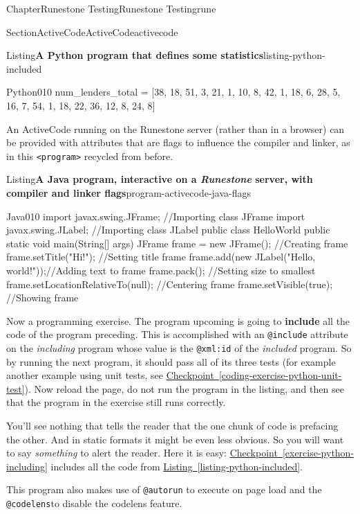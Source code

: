 \documentclass[oneside,10pt,]{book}
\newcommand{\xreffont}{\relax}
\newcommand{\mono}[1]{\texttt{#1}}
\newcommand{\terminology}[1]{\textbf{#1}}
\newcommand{\pubtitle}[1]{\textsl{#1}}
\numberwithin{equation}{section}
\begin{document}
\begin{chapterptx}{Chapter}{Runestone Testing}{}{Runestone Testing}{}{}{rune}
\begin{sectionptx}{Section}{ActiveCode}{}{ActiveCode}{}{}{activecode}
\begin{listingptx}{Listing}{\textbf{A Python program that defines some statistics}}{listing-python-included}{}
\begin{program}{Python}{0}{1}{0}
num_lenders_total = [38, 18, 51, 3, 21, 1, 10, 8, 42, 1, 18, 6, 28, 5, 16, 7, 54, 1, 18, 22, 36, 12, 8, 24, 8]
\end{program}
\end{listingptx}%
An ActiveCode running on the Runestone server (rather than in a browser) can be provided with attributes that are flags to influence the compiler and linker, as in this \mono{<program>} recycled from before.%
\begin{listingptx}{Listing}{\textbf{A Java program, interactive on a \pubtitle{Runestone} server, with compiler and linker flags}}{program-activecode-java-flags}{}%
\begin{program}{Java}{0}{1}{0}
import javax.swing.JFrame;  //Importing class JFrame
import javax.swing.JLabel;  //Importing class JLabel
public class HelloWorld {
    public static void main(String[] args) {
        JFrame frame = new JFrame();           //Creating frame
        frame.setTitle("Hi!");                 //Setting title frame
        frame.add(new JLabel("Hello, world!"));//Adding text to frame
        frame.pack();                          //Setting size to smallest
        frame.setLocationRelativeTo(null);     //Centering frame
        frame.setVisible(true);                //Showing frame
    }
}
\end{program}
\end{listingptx}%
Now a programming exercise.  The program upcoming is going to \terminology{include} all the code of the program preceding.  This is accomplished with an \mono{@include} attribute on the \emph{including} program whose value is the \mono{@xml:id} of the \emph{included} program.  So by running the next program, it should pass all of its three tests (for example another example using unit tests, see \hyperref[coding-exercise-python-unit-test]{Checkpoint~{\xreffont\ref{coding-exercise-python-unit-test}}}).  Now reload the page, do not run the program in the listing, and then see that the program in the exercise still runs correctly.%
\par
You'll see nothing that tells the reader that the one chunk of code is prefacing the other.  And in static formats it might be even less obvious.  So you will want to say \emph{something} to alert the reader.  Here it is easy: \hyperref[exercise-python-including]{Checkpoint~{\xreffont\ref{exercise-python-including}}} includes all the code from \hyperref[listing-python-included]{Listing~{\xreffont\ref{listing-python-included}}}.%
\par
This program also makes use of \mono{@autorun} to execute on page load and the \mono{@codelens}to disable the codelens feature.%

\end{sectionptx}
\end{chapterptx}
\end{document}
